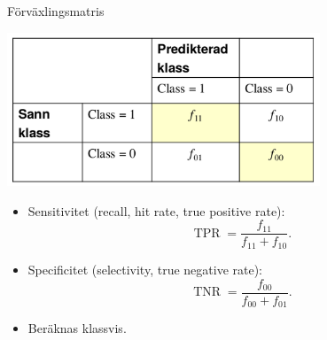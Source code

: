 \documentclass[10pt,english]{beamer}
\begin{document}
\begin{frame}{Förväxlingsmatris}
    \begin{center}
        \includegraphics[width=0.7\textwidth]{figs/Screenshot at 2020-08-18 12-24-31.png}
    \end{center}
    
    \begin{itemize}
        \item Sensitivitet (recall, hit rate, true positive rate):
        \begin{equation*}
            \operatorname{TPR} = \frac{f_{11} }{f_{11} + f_{10}}.
        \end{equation*}
        \item Specificitet (selectivity, true negative rate):
        \begin{equation*}
            \operatorname{TNR} = \frac{f_{00}}{f_{00} + f_{01}}.
        \end{equation*}
        \item Beräknas klassvis.
    \end{itemize}
        
\end{frame}
\end{document}
